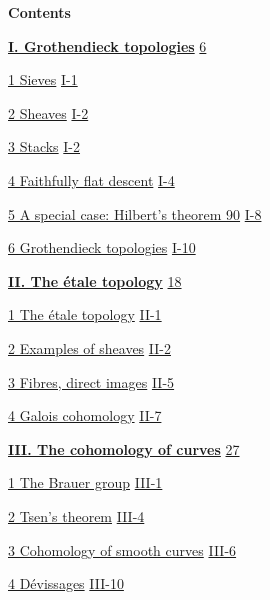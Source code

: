 \begingroup
\small
\setlength{\parindent}{0pt}
\begin{center}
  \textbf{Contents}
\end{center}

\hyperref[I:1]{\textbf{I. Grothendieck topologies}}\dotfill
  \hyperref[I:1]{6}\par
\hspace*{1.5em}\hyperref[I:1-1]{1 Sieves}\dotfill
  \hyperref[I:1-1]{I-1}\par
\hspace*{1.5em}\hyperref[I:1-2]{2 Sheaves}\dotfill
  \hyperref[I:1-2]{I-2}\par
\hspace*{1.5em}\hyperref[I:1-3]{3 Stacks}\dotfill
  \hyperref[I:1-3]{I-2}\par
\hspace*{1.5em}\hyperref[I:1-4]{4 Faithfully flat descent}\dotfill
  \hyperref[I:1-4]{I-4}\par
\hspace*{1.5em}\hyperref[I:1-5]{5 A special case: Hilbert’s theorem 90}\dotfill
  \hyperref[I:1-5]{I-8}\par
\hspace*{1.5em}\hyperref[I:1-6]{6 Grothendieck topologies}\dotfill
  \hyperref[I:1-6]{I-10}\par

\hyperref[I:2]{\textbf{II. The étale topology}}\dotfill
  \hyperref[I:2]{18}\par
\hspace*{1.5em}\hyperref[I:2-1]{1 The étale topology}\dotfill
  \hyperref[I:2-1]{II-1}\par
\hspace*{1.5em}\hyperref[I:2-2]{2 Examples of sheaves}\dotfill
  \hyperref[I:2-2]{II-2}\par
\hspace*{1.5em}\hyperref[I:2-3]{3 Fibres, direct images}\dotfill
  \hyperref[I:2-3]{II-5}\par
\hspace*{1.5em}\hyperref[I:2-4]{4 Galois cohomology}\dotfill
  \hyperref[I:2-4]{II-7}\par

\hyperref[I:3]{\textbf{III. The cohomology of curves}}\dotfill
  \hyperref[I:3]{27}\par
\hspace*{1.5em}\hyperref[I:3-1]{1 The Brauer group}\dotfill
  \hyperref[I:3-1]{III-1}\par
\hspace*{1.5em}\hyperref[I:3-2]{2 Tsen’s theorem}\dotfill
  \hyperref[I:3-2]{III-4}\par
\hspace*{1.5em}\hyperref[I:3-3]{3 Cohomology of smooth curves}\dotfill
  \hyperref[I:3-3]{III-6}\par
\hspace*{1.5em}\hyperref[I:3-4]{4 Dévissages}\dotfill
  \hyperref[I:3-4]{III-10}\par

